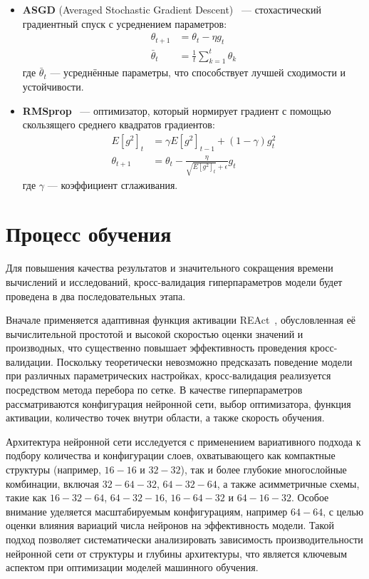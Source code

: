 \begin{itemize}
    \item \textbf{ASGD} (Averaged Stochastic Gradient Descent)~\cite{polyak1992acceleration} --- стохастический градиентный спуск с усреднением параметров:
    \[
    \begin{aligned}
        \theta_{t+1} &= \theta_t - \eta g_t \\
        \bar{\theta}_t &= \frac{1}{t} \sum_{k=1}^{t} \theta_k
    \end{aligned}
    \]
    где $\bar{\theta}_t$ --- усреднённые параметры, что способствует лучшей сходимости и устойчивости.

    \item \textbf{RMSprop}~\cite{tieleman2012lecture} --- оптимизатор, который нормирует градиент с помощью скользящего среднего квадратов градиентов:
    \[
    \begin{aligned}
        E[g^2]_t &= \gamma E[g^2]_{t-1} + (1 - \gamma) g_t^2 \\
        \theta_{t+1} &= \theta_t - \frac{\eta}{\sqrt{E[g^2]_t} + \epsilon} g_t
    \end{aligned}
    \]
    где $\gamma$ --- коэффициент сглаживания.
\end{itemize}

\section{Процесс обучения}
Для повышения качества результатов и значительного сокращения времени вычислений и
исследований, кросс-валидация гиперпараметров модели будет проведена в два
последовательных этапа.

Вначале применяется адаптивная функция активации
REAct~\cite{0d752c79fb816703274a3d37f85a85689a2a9405}, обусловленная её вычислительной
простотой и высокой скоростью оценки значений и производных, что существенно
повышает эффективность проведения кросс-валидации. Поскольку теоретически
невозможно предсказать поведение модели при различных параметрических настройках,
кросс-валидация реализуется посредством метода перебора по сетке. В качестве
гиперпараметров рассматриваются конфигурация нейронной сети, выбор оптимизатора,
функция активации, количество точек внутри области, а также скорость обучения.


Архитектура нейронной сети исследуется с применением вариативного подхода к
подбору количества и конфигурации слоев, охватывающего как компактные структуры
(например, $16-16$ и $32-32$), так и более глубокие многослойные комбинации,
включая $32-64-32$, $64-32-64$, а также асимметричные схемы, такие как
$16-32-64$, $64-32-16$, $16-64-32$ и $64-16-32$. Особое внимание уделяется
масштабируемым конфигурациям, например $64-64$, с целью оценки влияния
вариаций числа нейронов на эффективность модели. Такой подход позволяет
систематически анализировать зависимость производительности нейронной сети
от структуры и глубины архитектуры, что является ключевым аспектом при
оптимизации моделей машинного обучения.

